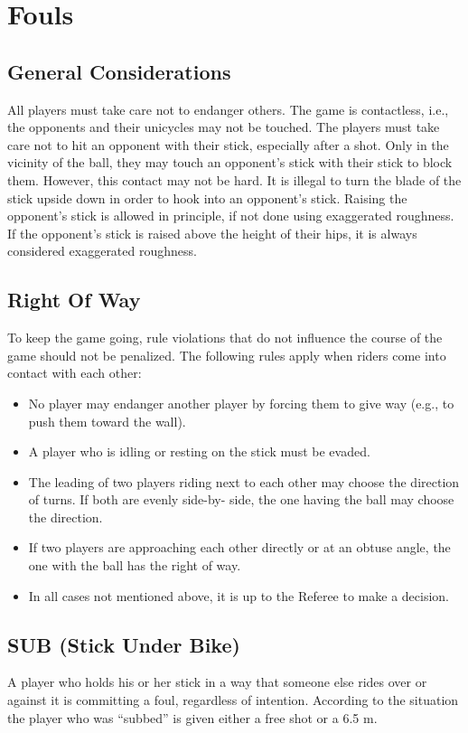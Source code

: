 \section{Fouls}

\subsection{General Considerations}
All players must take care not to endanger others. The game is contactless, i.e., the opponents and their unicycles may
not be touched. The players must take care not to hit an opponent with their stick, especially after a shot. Only in the
vicinity of the ball, they may touch an opponent’s stick with their stick to block them. However, this contact may not
be hard. It is illegal to turn the blade of the stick upside down in order to hook into an opponent's stick. Raising the
opponent's stick is allowed in principle, if not done using exaggerated roughness. If the opponent's stick is raised above
the height of their hips, it is always considered exaggerated roughness.

\subsection{Right Of Way}
To keep the game going, rule violations that do not influence the course of the game should not be penalized. The
following rules apply when riders come into contact with each other:\\
\begin{itemize}
\item No player may endanger another player by forcing them to give way (e.g., to push them toward the wall).
\item A player who is idling or resting on the stick must be evaded.
\item The leading of two players riding next to each other may choose the direction of turns. If both are evenly side-by-
side, the one having the ball may choose the direction.
\item If two players are approaching each other directly or at an obtuse angle, the one with the ball has the right of way.
\item In all cases not mentioned above, it is up to the Referee to make a decision.
\end{itemize}

\subsection{SUB (Stick Under Bike)}
A player who holds his or her stick in a way that someone else rides over or against it is committing a foul, regardless
of intention. According to the situation the player who was “subbed” is given either a free shot or a 6.5 m.

